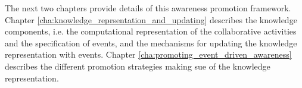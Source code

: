 The next two chapters provide details of this awareness promotion framework. Chapter \ref{cha:knowledge_reprsentation_and_updating} describes the knowledge components, i.e. the computational representation of the collaborative activities and the specification of events, and the mechanisms for updating the knowledge representation with events. Chapter \ref{cha:promoting_event_driven_awareness} describes the different promotion strategies making sue of the knowledge representation.



 

